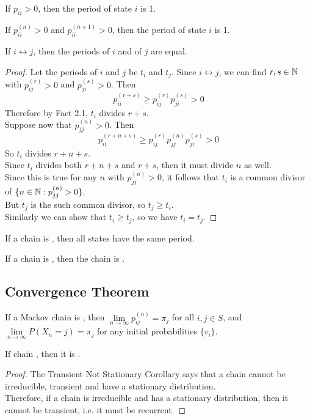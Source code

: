 \documentclass[11pt]{article}
\newcommand{\limit}[1]{\underset{{#1} \rightarrow \infty}{\lim}}
\newcommand{\dur}[3]{{#1}_{#2}^{({#3})}}
\begin{document}
    \fact
    If $p_{ii} >0$, then the period of state $i$ is 1.
    
    \fact
    If $\dur{p}{ii}{n} > 0$ and $\dur{p}{ii}{n+1} > 0$, then the period of state $i$ is 1.
    
     If $i \leftrightarrow j$, then the periods of $i$ and of $j$ are equal.
    \begin{proof}
    	Let the periods of $i$ and $j$ be $t_i$ and $t_j$. Since $i \leftrightarrow j$, we can find $r, s\in \mathbb{N}$ with $\dur{p}{ij}{r} > 0$ and $\dur{p}{ji}{s} > 0$. Then
    	$$\dur{p}{ii}{r+s} \geq \dur{p}{ij}{r}\dur{p}{ji}{s} > 0$$
    	Therefore by Fact 2.1, $t_i$ divides $r + s$.\\
    	Suppose now that $\dur{p}{jj}{n} > 0$. Then
    	$$\dur{p}{ii}{r + n +s} \geq \dur{p}{ij}{r}\dur{p}{jj}{n} \dur{p}{ji}{s} > 0$$
    	So $t_i$ divides $r + n +s$. \\
    	Since $t_i$ divides both $r + n +s$ and $r + s$, then it must divide $n$ as well. \\
    	Since this is true for any $n$ with $\dur{p}{jj}{n} > 0$, it follows that $t_i$ is a common divisor of $\{n \in \mb{N}: \dur{p}{jj}{n} > 0\}$.\\
    	But $t_j$ is the  such common divisor, so $t_j \geq t_i$.\\
    	Similarly we can show that $t_i \geq t_j$, so we have $t_i = t_j$.
  
    	
    \end{proof} 
    
    If a chain is , then all states have the same period.
    
    \corollary If a chain is , then the chain is .
    
    \subsection{Convergence Theorem}
     If a Markov chain is , then $\limit{n} p_{ij}^{(n)} = \pi_j$ for all $i, j \in S$, and $\limit{n} P(X_n = j) = \pi_j$ for any initial probabilities $\{v_i\}$.
    
     If chain , then it is .
    \begin{proof}
    	The Transient Not Stationary Corollary says that a chain cannot be irreducible, transient and have a stationary distribution. \\
    	Therefore, if a chain is irreducible and has a stationary distribution, then it cannot be transient, i.e. it must be recurrent.
    \end{proof}
    
\end{document}
